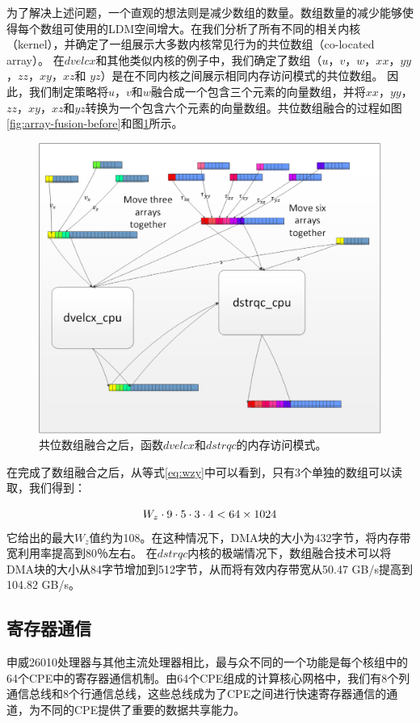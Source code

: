 \documentclass[degree=doctor]{thuthesis}
\begin{document}
为了解决上述问题，一个直观的想法则是减少数组的数量。数组数量的减少能够使得每个数组可使用的LDM空间增大。在我们分析了所有不同的相关内核（kernel），并确定了一组展示大多数内核常见行为的共位数组（co-located array）。 在$ dvelcx $和其他类似内核的例子中，我们确定了数组（$ u $，$ v $，$ w $，$ xx $，$ yy $，$ zz $，$ xy $，$ xz $和 $ yz $）是在不同内核之间展示相同内存访问模式的共位数组。 因此，我们制定策略将$ u $，$ v $和$ w $融合成一个包含三个元素的向量数组，并将$ xx $，$ yy $，$ zz $，$ xy $，$ xz $和$ yz $转换为一个包含六个元素的向量数组。共位数组融合的过程如图\ref{fig:array-fusion-before}和图\ref{fig:array-fusion-after}所示。

\begin{figure}[h]
\centering
\includegraphics[width=0.7\columnwidth]{awp_after.png}
\caption{共位数组融合之后，函数$dvelcx$和$dstrqc$的内存访问模式。}
\label{fig:array-fusion-after}
\end{figure}

在完成了数组融合之后，从等式\ref{eq:wzy}中可以看到，只有3个单独的数组可以读取，我们得到：

\begin{equation}
W_z \cdot 9 \cdot 5 \cdot 3 \cdot 4 < 64 \times 1024\\
\label{eq:wzy2}
\end{equation}
它给出的最大$ W_z $值约为108。在这种情况下，DMA块的大小为432字节，将内存带宽利用率提高到80％左右。 在$ dstrqc $内核的极端情况下，数组融合技术可以将DMA块的大小从84字节增加到512字节，从而将有效内存带宽从50.47 GB/s提高到104.82 GB/s。

\subsection{寄存器通信}

申威26010处理器与其他主流处理器相比，最与众不同的一个功能是每个核组中的64个CPE中的寄存器通信机制。由64个CPE组成的计算核心网格中，我们有8个列通信总线和8个行通信总线，这些总线成为了CPE之间进行快速寄存器通信的通道，为不同的CPE提供了重要的数据共享能力。
\end{document}
